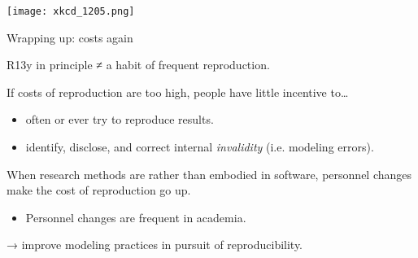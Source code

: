 \documentclass[12pt,aspectratio=169]{beamer}
\begin{document}
\begin{frame}[plain]
  \centering
  \texttt{[image: xkcd\_1205.png]}
\end{frame}

\begin{frame}{Wrapping up: costs again}

  R13y in principle ≠ a habit of frequent reproduction.

  If costs of reproduction are too high, people have little incentive to…
  \begin{itemize}
    \item often or ever try to reproduce results.

    \item identify, disclose, and correct internal \emph{invalidity} (i.e. modeling errors).
  \end{itemize}

  \bigskip
  When research methods are  rather than embodied in software, personnel changes make the cost of reproduction go up.

  \begin{itemize}
    \item Personnel changes are frequent in academia.
  \end{itemize}

  \bigskip
   → improve modeling practices in pursuit of reproducibility.

\end{frame}
\end{document}
